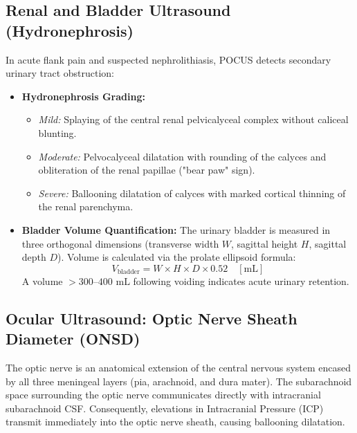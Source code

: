 \documentclass[11pt,a4paper]{article}
\begin{document}
\subsection{Renal and Bladder Ultrasound (Hydronephrosis)}
In acute flank pain and suspected nephrolithiasis, POCUS detects secondary urinary tract obstruction:
\begin{itemize}[leftmargin=2em]
    \item \textbf{Hydronephrosis Grading:}
    \begin{itemize}
        \item \textit{Mild:} Splaying of the central renal pelvicalyceal complex without caliceal blunting.
        \item \textit{Moderate:} Pelvocalyceal dilatation with rounding of the calyces and obliteration of the renal papillae ("bear paw" sign).
        \item \textit{Severe:} Ballooning dilatation of calyces with marked cortical thinning of the renal parenchyma.
    \end{itemize}
    \item \textbf{Bladder Volume Quantification:} The urinary bladder is measured in three orthogonal dimensions (transverse width $W$, sagittal height $H$, sagittal depth $D$). Volume is calculated via the prolate ellipsoid formula:
    \begin{equation}
        V_{\text{bladder}} = W \times H \times D \times 0.52 \quad [\text{mL}]
    \end{equation}
    A volume $> 300\text{--}400\text{ mL}$ following voiding indicates acute urinary retention.
\end{itemize}

\subsection{Ocular Ultrasound: Optic Nerve Sheath Diameter (ONSD)}
The optic nerve is an anatomical extension of the central nervous system encased by all three meningeal layers (pia, arachnoid, and dura mater). The subarachnoid space surrounding the optic nerve communicates directly with intracranial subarachnoid CSF. Consequently, elevations in Intracranial Pressure (ICP) transmit immediately into the optic nerve sheath, causing ballooning dilatation.
\end{document}
